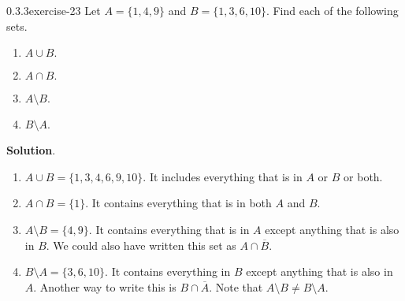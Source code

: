 \documentclass[twoside,11pt,]{book}
\numberwithin{equation}{chapter}
\renewcommand{\bar}{\overline}
\begin{document}
\begin{divisionsolution}{0.3.3}{}{exercise-23}%
\hypertarget{p-577}{}%
Let \(A = \{1, 4, 9\}\) and \(B = \{1, 3, 6, 10\}\text{.}\) Find each of the following sets.\leavevmode%
\begin{enumerate}[label=(\alph*)]
\item\hypertarget{li-584}{}\hypertarget{p-578}{}%
\(A \cup B\text{.}\)%
\item\hypertarget{li-585}{}\hypertarget{p-580}{}%
\(A \cap B\text{.}\)%
\item\hypertarget{li-586}{}\hypertarget{p-582}{}%
\(A \setminus B\text{.}\)%
\item\hypertarget{li-587}{}\hypertarget{p-584}{}%
\(B \setminus A\text{.}\)%
\end{enumerate}
%
\par\smallskip%
\noindent\textbf{Solution}.\quad%
\hypertarget{p-586}{}%
\leavevmode%
\begin{enumerate}[label=(\alph*)]
\item\hypertarget{li-588}{}\hypertarget{p-587}{}%
\(A \cup B = \{1,3,4,6,9,10\}\text{.}\) It includes everything that is in \(A\) or \(B\) or both.%
\item\hypertarget{li-589}{}\hypertarget{p-588}{}%
\(A \cap B = \{1\}\text{.}\) It contains everything that is in both \(A\) and \(B\text{.}\)%
\item\hypertarget{li-590}{}\hypertarget{p-589}{}%
\(A \setminus B = \{4, 9\}\text{.}\) It contains everything that is in \(A\) except anything that is also in \(B\text{.}\) We could also have written this set as \(A \cap \bar{B}\text{.}\)%
\item\hypertarget{li-591}{}\hypertarget{p-590}{}%
\(B \setminus A = \{3, 6, 10\}\text{.}\) It contains everything in \(B\) except anything that is also in \(A\text{.}\) Another way to write this is \(B \cap \bar{A}\text{.}\) Note that \(A \setminus B \ne B \setminus A\text{.}\)%
\end{enumerate}
%
\end{divisionsolution}%
\end{document}
